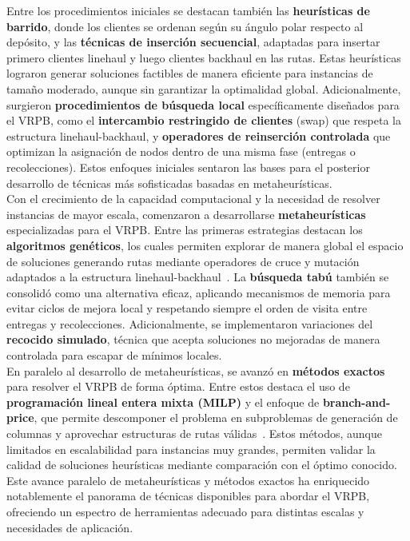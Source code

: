 \documentclass[letter, 10pt]{article}
\begin{document}
Entre los procedimientos iniciales se destacan tambi\'en las \textbf{heur\'isticas de barrido}, donde los clientes se ordenan seg\'un su \'angulo polar respecto al dep\'osito, y las \textbf{t\'ecnicas de inserci\'on secuencial}, adaptadas para insertar primero clientes linehaul y luego clientes backhaul en las rutas. Estas heur\'isticas lograron generar soluciones factibles de manera eficiente para instancias de tama\~no moderado, aunque sin garantizar la optimalidad global. Adicionalmente, surgieron \textbf{procedimientos de b\'usqueda local} espec\'ificamente dise\~nados para el VRPB, como el \textbf{intercambio restringido de clientes} (swap) que respeta la estructura linehaul-backhaul, y \textbf{operadores de reinserci\'on controlada} que optimizan la asignaci\'on de nodos dentro de una misma fase (entregas o recolecciones). Estos enfoques iniciales sentaron las bases para el posterior desarrollo de t\'ecnicas m\'as sofisticadas basadas en metaheur\'isticas.\\

Con el crecimiento de la capacidad computacional y la necesidad de resolver instancias de mayor escala, comenzaron a desarrollarse \textbf{metaheur\'isticas} especializadas para el VRPB. Entre las primeras estrategias destacan los \textbf{algoritmos gen\'eticos}, los cuales permiten explorar de manera global el espacio de soluciones generando rutas mediante operadores de cruce y mutaci\'on adaptados a la estructura linehaul-backhaul~\cite{koc2018review}. La \textbf{b\'usqueda tab\'u} tambi\'en se consolid\'o como una alternativa eficaz, aplicando mecanismos de memoria para evitar ciclos de mejora local y respetando siempre el orden de visita entre entregas y recolecciones. Adicionalmente, se implementaron variaciones del \textbf{recocido simulado}, t\'ecnica que acepta soluciones no mejoradas de manera controlada para escapar de m\'inimos locales.\\

En paralelo al desarrollo de metaheur\'isticas, se avanz\'o en \textbf{m\'etodos exactos} para resolver el VRPB de forma \'optima. Entre estos destaca el uso de \textbf{programaci\'on lineal entera mixta (MILP)} y el enfoque de \textbf{branch-and-price}, que permite descomponer el problema en subproblemas de generaci\'on de columnas y aprovechar estructuras de rutas v\'alidas~\cite{queiroga2020exact}. Estos m\'etodos, aunque limitados en escalabilidad para instancias muy grandes, permiten validar la calidad de soluciones heur\'isticas mediante comparaci\'on con el \'optimo conocido. Este avance paralelo de metaheur\'isticas y m\'etodos exactos ha enriquecido notablemente el panorama de t\'ecnicas disponibles para abordar el VRPB, ofreciendo un espectro de herramientas adecuado para distintas escalas y necesidades de aplicaci\'on.\\
\end{document}
